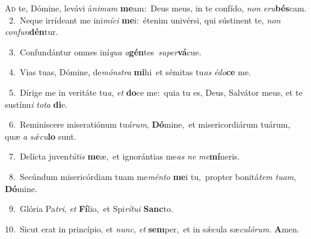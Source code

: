 \lettrine{\initial\textcolor{\initialcolor}{A}}{d} te, Dómine, levávi á\-\textit{ni}\-\textit{mam} \textbf{me}\-am:~\star Deus meus, in te confído, \textit{non} \textit{e}\-\textit{ru}\textbf{bés}cam.\\
{\numbfont\textcolor{\numbcolor}{~2.}}~Neque irrídeant me ini\-\textit{mí}\-\textit{ci} \textbf{me}\-i:~\star étenim univérsi, qui sústinent te, \textit{non} \textit{con}\-\textit{fun}\textbf{dén}tur.\par
{\numbfont\textcolor{\numbcolor}{~3.}}~Confundántur omnes iní\textit{qua} \textit{a}\-\textbf{gén}tes~\star \textit{su}\-\textit{per}\textbf{vá}cue.\par
{\numbfont\textcolor{\numbcolor}{~4.}}~Vias tuas, Dómine, de\-\textit{móns}\-\textit{tra} \textbf{mi}\-hi~\star et sémitas tu\textit{as} \textit{é}\-\textit{do}\textbf{ce} me.\par
{\numbfont\textcolor{\numbcolor}{~5.}}~Dírige me in veritáte tu\-\textit{a}\-, \textit{et} \textbf{do}\-ce me:~\star quia tu es, Deus, Salvátor meus, et te sustínu\textit{i} \textit{to}\-\textit{ta} \textbf{di}\-e.\par
{\numbfont\textcolor{\numbcolor}{~6.}}~Reminíscere miseratiónum tu\-\textit{á}\-\textit{rum}, \textbf{Dó}\-mine,~\star et misericordiárum tuárum, quæ \textit{a} \textit{sǽ}\-\textit{cu}\textbf{lo} sunt.\par
{\numbfont\textcolor{\numbcolor}{~7.}}~Delícta juven\-\textit{tú}\-\textit{tis} \textbf{me}\-æ,~\star et ignorántias me\textit{as} \textit{ne} \textit{me}\-\textbf{mí}neris.\par
{\numbfont\textcolor{\numbcolor}{~8.}}~Secúndum misericórdiam tuam me\-\textit{mén}\-\textit{to} \textbf{me}\-i tu,~\star propter bonitá\textit{tem} \textit{tu}\-\textit{am}, \textbf{Dó}\-mine.\par
{\numbfont\textcolor{\numbcolor}{~9.}}~Glória Pa\-\textit{tri}\-, \textit{et} \textbf{Fí}\-lio,~\star et Spi\-\textit{rí}\-\textit{tu}\textit{i} \textbf{Sanc}\-to.\par
{\numbfont\textcolor{\numbcolor}{10.}}~Sicut erat in princípio, et \textit{nunc}\-, \textit{et} \textbf{sem}\-per,~\star et in sǽcula sæ\-\textit{cu}\-\textit{ló}\textit{rum}. \textbf{A}\-men.\par
